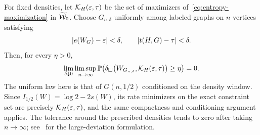 For fixed densities, let $\mathcal K_H(\varepsilon,\tau)$ be the set of maximizers
of~\eqref{eq:entropy-maximization} in $\widetilde{\mathcal W}_0$.
Choose $G_{n,\delta}$ uniformly among labeled graphs on $n$ vertices satisfying
\[
  |e(W_G)-\varepsilon|<\delta,
  \qquad |t(H,G)-\tau|<\delta.
\]
Then, for every $\eta>0$,
\begin{equation*}
  \lim_{\delta\downarrow0}\limsup_{n\to\infty}
  \mathbb P\!\left(
    \delta_\square\bigl(W_{G_{n,\delta}},\mathcal K_H(\varepsilon,\tau)\bigr)\ge\eta
  \right)=0.
\end{equation*}
The uniform law here is that of $G(n,1/2)$ conditioned on the density
window.  Since $I_{1/2}(W)=\log2-2s(W)$, its rate minimizers on the exact
constraint set are precisely $\mathcal K_H(\varepsilon,\tau)$, and the same
compactness and conditioning argument applies.  The tolerance around the
prescribed densities tends to zero after taking $n\to\infty$;
see~\cite[Section~1]{DemboLubetzky2018}
for the large-deviation formulation.
